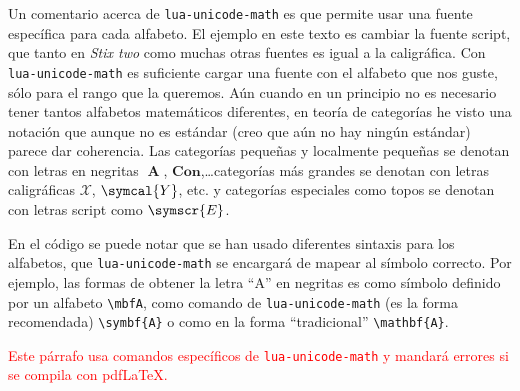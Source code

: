 \ifluatex%
Un comentario acerca de \texttt{lua-unicode-math} es que permite usar una
fuente específica para cada alfabeto. El ejemplo en este texto es cambiar la
fuente script, que tanto en \textit{Stix two} como muchas otras fuentes es
igual a la caligráfica. Con \texttt{lua-unicode-math} es suficiente cargar una
fuente con el alfabeto que nos guste, sólo para el rango que la queremos.
Aún cuando en un principio no es necesario tener tantos alfabetos matemáticos
diferentes, en teoría de categorías he visto una notación que aunque no es
estándar (creo que aún no hay ningún estándar) parece dar coherencia. Las
categorías pequeñas y localmente pequeñas se denotan con letras en negritas
\(\mbfA \), \(\symbf{Con}\),\ldots categorías más grandes se denotan con
letras caligráficas \(\mathcal{X}\), \(\symcal{Y}\), etc. y categorías
especiales como topos se denotan con letras script como \(\symscr{E}\).

En el código se puede notar que se han usado diferentes sintaxis para los
alfabetos, que \texttt{lua-unicode-math} se encargará de mapear al símbolo
correcto. Por ejemplo, las formas de obtener la letra \enquote{A} en negritas es
como símbolo definido por un alfabeto \verb|\mbfA|, como comando de
\texttt{lua-unicode-math} (es la forma recomendada) \verb|\symbf{A}| o como en
la forma \enquote{tradicional} \verb|\mathbf{A}|.
\ifpdftex%
\begin{center}
  \textcolor{red}{Este párrafo usa comandos específicos de \texttt{lua-unicode-math} y mandará errores si se compila con pdf\LaTeX.}
\end{center}
\fi
\fi
